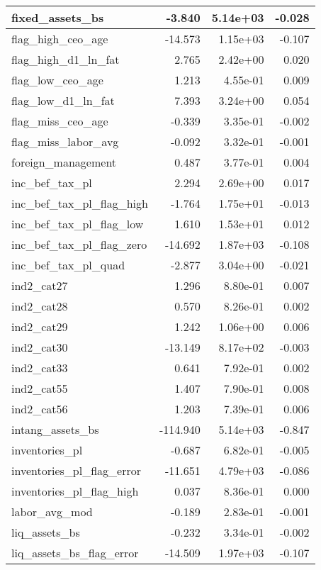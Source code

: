 \begin{table}
\begin{tabular}[t]{l|r|r|r}
\hline
fixed\_assets\_bs & -3.840 & 5.14e+03 & -0.028\\
\hline
flag\_high\_ceo\_age & -14.573 & 1.15e+03 & -0.107\\
\hline
flag\_high\_d1\_ln\_fat & 2.765 & 2.42e+00 & 0.020\\
\hline
flag\_low\_ceo\_age & 1.213 & 4.55e-01 & 0.009\\
\hline
flag\_low\_d1\_ln\_fat & 7.393 & 3.24e+00 & 0.054\\
\hline
flag\_miss\_ceo\_age & -0.339 & 3.35e-01 & -0.002\\
\hline
flag\_miss\_labor\_avg & -0.092 & 3.32e-01 & -0.001\\
\hline
foreign\_management & 0.487 & 3.77e-01 & 0.004\\
\hline
inc\_bef\_tax\_pl & 2.294 & 2.69e+00 & 0.017\\
\hline
inc\_bef\_tax\_pl\_flag\_high & -1.764 & 1.75e+01 & -0.013\\
\hline
inc\_bef\_tax\_pl\_flag\_low & 1.610 & 1.53e+01 & 0.012\\
\hline
inc\_bef\_tax\_pl\_flag\_zero & -14.692 & 1.87e+03 & -0.108\\
\hline
inc\_bef\_tax\_pl\_quad & -2.877 & 3.04e+00 & -0.021\\
\hline
ind2\_cat27 & 1.296 & 8.80e-01 & 0.007\\
\hline
ind2\_cat28 & 0.570 & 8.26e-01 & 0.002\\
\hline
ind2\_cat29 & 1.242 & 1.06e+00 & 0.006\\
\hline
ind2\_cat30 & -13.149 & 8.17e+02 & -0.003\\
\hline
ind2\_cat33 & 0.641 & 7.92e-01 & 0.002\\
\hline
ind2\_cat55 & 1.407 & 7.90e-01 & 0.008\\
\hline
ind2\_cat56 & 1.203 & 7.39e-01 & 0.006\\
\hline
intang\_assets\_bs & -114.940 & 5.14e+03 & -0.847\\
\hline
inventories\_pl & -0.687 & 6.82e-01 & -0.005\\
\hline
inventories\_pl\_flag\_error & -11.651 & 4.79e+03 & -0.086\\
\hline
inventories\_pl\_flag\_high & 0.037 & 8.36e-01 & 0.000\\
\hline
labor\_avg\_mod & -0.189 & 2.83e-01 & -0.001\\
\hline
liq\_assets\_bs & -0.232 & 3.34e-01 & -0.002\\
\hline
liq\_assets\_bs\_flag\_error & -14.509 & 1.97e+03 & -0.107\\

\end{tabular}
\end{table}
